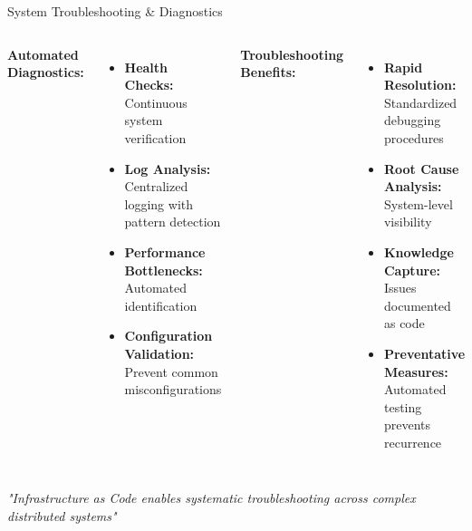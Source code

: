 \documentclass[aspectratio=169]{beamer}
\begin{document}
\begin{frame}{System Troubleshooting \& Diagnostics}
  \begin{columns}
    \textbf{Automated Diagnostics:}
    \begin{itemize}
      \item \textbf{Health Checks:} Continuous system verification
      \item \textbf{Log Analysis:} Centralized logging with pattern detection
      \item \textbf{Performance Bottlenecks:} Automated identification
      \item \textbf{Configuration Validation:} Prevent common misconfigurations
    \end{itemize}
    
    \textbf{Troubleshooting Benefits:}
    \begin{itemize}
      \item \textbf{Rapid Resolution:} Standardized debugging procedures
      \item \textbf{Root Cause Analysis:} System-level visibility
      \item \textbf{Knowledge Capture:} Issues documented as code
      \item \textbf{Preventative Measures:} Automated testing prevents recurrence
    \end{itemize}
  \end{columns}
  
  \vspace{0.3cm}
  \begin{center}
    \textit{"Infrastructure as Code enables systematic troubleshooting across complex distributed systems"}
  \end{center}
\end{frame}
\end{document}
